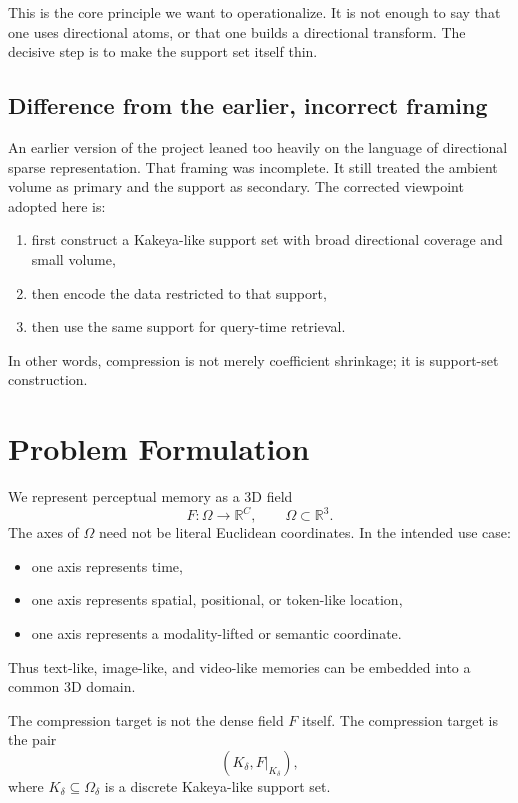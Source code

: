 \documentclass[11pt]{article}
\begin{document}
This is the core principle we want to operationalize. It is not enough to say that one uses directional atoms, or that one builds a directional transform. The decisive step is to make the support set itself thin.

\subsection{Difference from the earlier, incorrect framing}
An earlier version of the project leaned too heavily on the language of directional sparse representation. That framing was incomplete. It still treated the ambient volume as primary and the support as secondary. The corrected viewpoint adopted here is:
\begin{enumerate}[leftmargin=1.5em]
\item first construct a Kakeya-like support set with broad directional coverage and small volume,
\item then encode the data restricted to that support,
\item then use the same support for query-time retrieval.
\end{enumerate}

In other words, compression is not merely coefficient shrinkage; it is support-set construction.

\section{Problem Formulation}
We represent perceptual memory as a 3D field
\begin{equation}
F:\Omega\to\mathbb{R}^C,\qquad \Omega\subset\mathbb{R}^3.
\end{equation}
The axes of $\Omega$ need not be literal Euclidean coordinates. In the intended use case:
\begin{itemize}[leftmargin=1.5em]
\item one axis represents time,
\item one axis represents spatial, positional, or token-like location,
\item one axis represents a modality-lifted or semantic coordinate.
\end{itemize}
Thus text-like, image-like, and video-like memories can be embedded into a common 3D domain.

The compression target is not the dense field $F$ itself. The compression target is the pair
\begin{equation}
(K_\delta, F|_{K_\delta}),
\end{equation}
where $K_\delta\subseteq \Omega_\delta$ is a discrete Kakeya-like support set.
\end{document}
